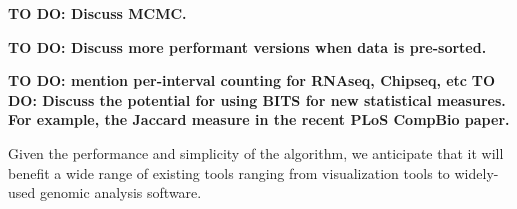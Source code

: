 \documentclass{bioinfo}
\begin{document}
        \textbf{TO DO: Discuss MCMC.}
        
        \textbf{TO DO: Discuss more performant versions when data is pre-sorted.}

        \textbf{TO DO: mention per-interval counting for RNAseq, Chipseq, etc}
        \textbf{TO DO: Discuss the potential for using BITS for new statistical measures.  For
        example, the Jaccard measure in the recent PLoS CompBio paper.}
        
        Given the performance and simplicity of the algorithm, we
        anticipate that it will benefit a wide range of existing tools ranging from
        visualization tools to widely-used genomic analysis software.

        
        
\end{document}
